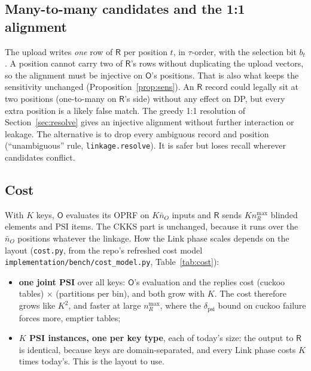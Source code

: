 \documentclass[10pt]{article}
\newcommand{\Rp}{\mathsf{R}}
\newcommand{\Op}{\mathsf{O}}
\begin{document}
\subsection{Many-to-many candidates and the 1:1 alignment}
The upload writes \emph{one} row of $\Rp$ per position $t$, in $\tau$-order, with the selection bit $b_t$. A position cannot carry two of $\Rp$'s rows without duplicating the upload vectors, so the alignment must be injective on $\Op$'s positions. That is also what keeps the sensitivity unchanged (Proposition~\ref{prop:sens}). An $\Rp$ record could legally sit at two positions (one-to-many on $\Rp$'s side) without any effect on DP, but every extra position is a likely false match. The greedy 1:1 resolution of Section~\ref{sec:resolve} gives an injective alignment without further interaction or leakage. The alternative is to drop every ambiguous record and position (``unambiguous'' rule, \texttt{linkage.resolve}). It is safer but loses recall wherever candidates conflict.

\subsection{Cost}
With $K$ keys, $\Op$ evaluates its OPRF on $K\bar n_O$ inputs and $\Rp$ sends $K n_R^{\max}$ blinded elements and PSI items. The CKKS part is unchanged, because it runs over the $\bar n_O$ positions whatever the linkage. How the Link phase scales depends on the layout (\texttt{cost.py}, from the repo's refreshed cost model \texttt{implementation/bench/cost\_model.py}, Table~\ref{tab:cost}):
\begin{itemize}
\item \textbf{one joint PSI} over all keys: $\Op$'s evaluation and the replies cost (cuckoo tables) $\times$ (partitions per bin), and both grow with $K$. The cost therefore grows like $K^2$, and faster at large $n_R^{\max}$, where the $\delta_{\mathrm{psi}}$ bound on cuckoo failure forces more, emptier tables;
\item \textbf{$K$ PSI instances, one per key type}, each of today's size: the output to $\Rp$ is identical, because keys are domain-separated, and every Link phase costs $K$ times today's. This is the layout to use.
\end{itemize}

\end{document}
